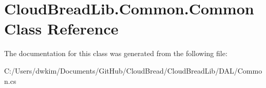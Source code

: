 \hypertarget{class_cloud_bread_lib_1_1_common_1_1_common}{}\section{Cloud\+Bread\+Lib.\+Common.\+Common Class Reference}
\label{class_cloud_bread_lib_1_1_common_1_1_common}


The documentation for this class was generated from the following file\+:\begin{DoxyCompactItemize}
\item 
C\+:/\+Users/dwkim/\+Documents/\+Git\+Hub/\+Cloud\+Bread/\+Cloud\+Bread\+Lib/\+D\+A\+L/Common.\+cs\end{DoxyCompactItemize}
